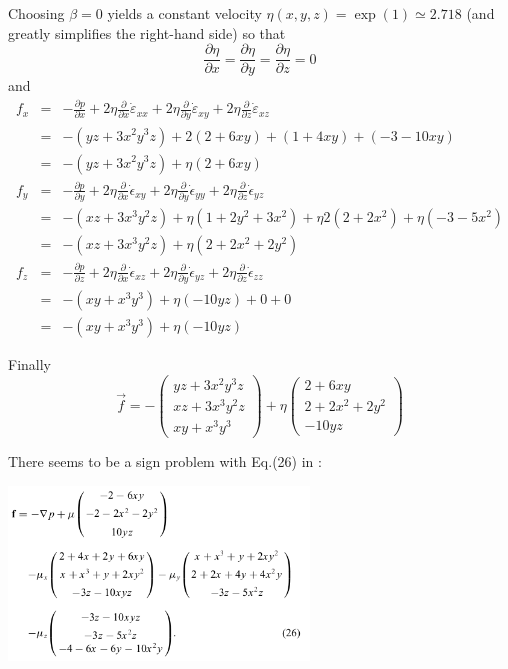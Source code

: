 Choosing $\beta=0$ yields a constant velocity $\eta(x,y,z) = \exp(1) \simeq 2.718$
(and greatly simplifies the right-hand side) so that 
\[
\frac{\partial \eta}{\partial x}  = 
\frac{\partial \eta}{\partial y}  =
\frac{\partial \eta}{\partial z}  = 0
\]
and 
\begin{eqnarray}
f_x 
&=& 
-\frac{\partial p}{\partial x} 
+2\eta\frac{\partial}{\partial x} \dot{\varepsilon}_{xx}
+2\eta\frac{\partial}{\partial y} \dot{\varepsilon}_{xy}
+2\eta\frac{\partial}{\partial z} \dot{\varepsilon}_{xz} \nonumber\\
&=&
-(yz+3x^2y^3z)
+ 2(2 +6xy) + (1+4xy) + (-3 -10xy)   \nonumber\\
&=&
-(yz+3x^2y^3z)
+\eta(2+6xy ) \nonumber\\
f_y 
&=&  
-\frac{\partial p}{\partial y} 
+2\eta\frac{\partial}{\partial x} \dot{\epsilon}_{xy}
+2\eta\frac{\partial}{\partial y} \dot{\epsilon}_{yy}
+2\eta\frac{\partial}{\partial z} \dot{\epsilon}_{yz}  \nonumber\\
&=&
-(xz +3x^3y^2z)
+
\eta(1+2y^2+3x^2)
+\eta 2( 2+2x^2 )  
+\eta(-3-5x^2) \nonumber\\
&=&
-(xz +3x^3y^2z)
+ \eta ( 2 + 2x^2 +  2y^2)
\nonumber\\ 
f_z 
&=&
-\frac{\partial p}{\partial z} 
+2\eta\frac{\partial}{\partial x} \dot{\epsilon}_{xz}
+2\eta\frac{\partial}{\partial y} \dot{\epsilon}_{yz}
+2\eta\frac{\partial}{\partial z} \dot{\epsilon}_{zz}  \nonumber\\
&=&
-(xy+x^3y^3) 
+ \eta (-10yz) + 0 + 0 \nonumber\\
&=&
-(xy+x^3y^3) 
+\eta (-10yz) \nonumber
\end{eqnarray}

Finally
\begin{equation}
\vec{f} = 
-
\left(
\begin{array}{c}
yz+3x^2y^3z\\
xz +3x^3y^2z \\
xy+x^3y^3
\end{array}
\right)
+\eta
\left(
\begin{array}{c}
2+6xy  \\
2 + 2x^2 +  2y^2 \\
-10yz 
\end{array}
\right)
\end{equation}

\begin{remark}
There seems to be a sign problem with Eq.(26) in \textcite{busa13}:
\begin{center}
\includegraphics[width=8cm]{images/mms/busa13_eq26}
\end{center}
\end{remark}


